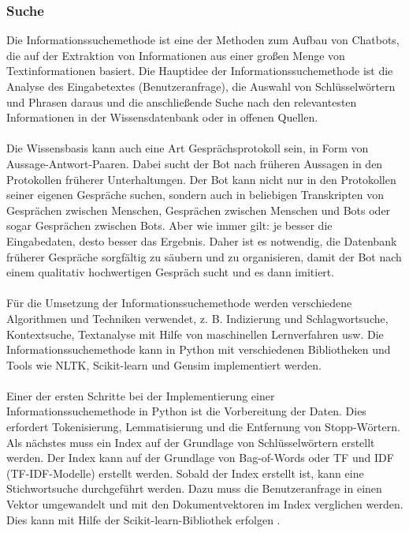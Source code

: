 \subsubsection{Suche}
Die Informationssuchemethode ist eine der Methoden zum Aufbau von Chatbots, die auf der Extraktion von Informationen aus einer großen Menge von Textinformationen basiert. 
Die Hauptidee der Informationssuchemethode ist die Analyse des Eingabetextes (Benutzeranfrage), die Auswahl von Schlüsselwörtern und Phrasen daraus und die anschließende Suche nach den relevantesten Informationen in der Wissensdatenbank oder in offenen Quellen. \cite{diana_conversational_2011}\\\\
Die Wissensbasis kann auch eine Art \glqq{}Gesprächsprotokoll\grqq{} sein, in Form von Aussage-Antwort-Paaren. 
Dabei sucht der Bot nach früheren Aussagen in den Protokollen früherer Unterhaltungen. 
Der Bot kann nicht nur in den Protokollen seiner eigenen Gespräche suchen, sondern auch in beliebigen Transkripten von Gesprächen zwischen Menschen, Gesprächen zwischen Menschen und Bots oder sogar Gesprächen zwischen Bots.
Aber wie immer gilt: je besser die Eingabedaten, desto besser das Ergebnis. 
Daher ist es notwendig, die Datenbank früherer Gespräche sorgfältig zu säubern und zu organisieren, damit der Bot nach einem qualitativ hochwertigen Gespräch sucht und es dann imitiert.\\\\
Für die Umsetzung der Informationssuchemethode werden verschiedene Algorithmen und Techniken verwendet, z. B. Indizierung und Schlagwortsuche, Kontextsuche, Textanalyse mit Hilfe von maschinellen Lernverfahren usw. 
Die Informationssuchemethode kann in Python mit verschiedenen Bibliotheken und Tools wie \ac{NLTK}, Scikit-learn und Gensim implementiert werden.\\\\
Einer der ersten Schritte bei der Implementierung einer Informationssuchemethode in Python ist die Vorbereitung der Daten. 
Dies erfordert Tokenisierung, Lemmatisierung und die Entfernung von Stopp-Wörtern. 
Als nächstes muss ein Index auf der Grundlage von Schlüsselwörtern erstellt werden. 
Der Index kann auf der Grundlage von Bag-of-Words oder \ac{TF} und \ac{IDF} (TF-IDF-Modelle) erstellt werden. 
Sobald der Index erstellt ist, kann eine Stichwortsuche durchgeführt werden. 
Dazu muss die Benutzeranfrage in einen Vektor umgewandelt und mit den Dokumentvektoren im Index verglichen werden. 
Dies kann mit Hilfe der Scikit-learn-Bibliothek erfolgen \cite{scikit-learn}.
